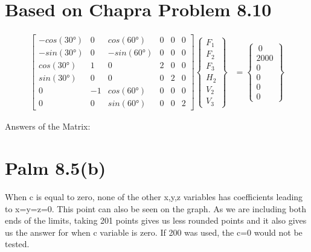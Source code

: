 \documentclass{article}
\begin{document}
\section{Based on Chapra Problem 8.10}
\begin{align*}
\begin{bmatrix}
-cos(30°) & 0 & cos(60°) & 0 & 0 & 0\\
-sin(30°) & 0 & -sin(60°) & 0 & 0 & 0\\
cos(30°) & 1 & 0 &2 & 0 & 0\\
sin(30°) & 0 & 0 & 0 & 2 & 0\\
0 & -1 & cos(60°) & 0 & 0 & 0\\
0 & 0 & sin(60°) & 0 & 0 & 2
\end{bmatrix}
\begin{Bmatrix}
F_1 \\ F_2 \\ F_3 \\ H_2 \\ V_2 \\ V_3
\end{Bmatrix}&=
\begin{Bmatrix}
~ 0 ~ \\ 2000 \\ 0 \\ 0 \\ 0 \\ 0
\end{Bmatrix}
\end{align*}

Answers of the Matrix:
\begin{center}
{\tt

}
\end{center}

\section{Palm 8.5(b)}
When c is equal to zero, none of the other x,y,z variables has coefficients leading to x=y=z=0. This point can also be seen on the graph. As we are including both ends of the limits, taking 201 points gives us less rounded points and it also gives us the answer for when c variable is zero. If 200 was used, the c=0 would not be tested.
\end{document}
